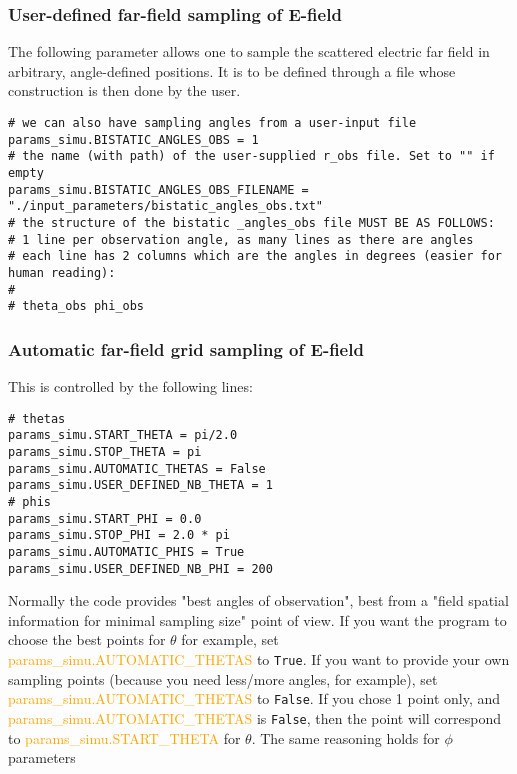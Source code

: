 \documentclass[a4paper,10pt]{book}
\newcommand{\parameter}[1] {\textcolor{orange}{\textsf{#1}}}
\begin{document}
\subsubsection{User-defined far-field sampling of E-field}
%
\par
The following parameter allows one to sample the scattered electric far field in arbitrary, angle-defined positions. It is to be defined through a file whose construction is then done by the user.
\begin{verbatim}
# we can also have sampling angles from a user-input file
params_simu.BISTATIC_ANGLES_OBS = 1
# the name (with path) of the user-supplied r_obs file. Set to "" if empty
params_simu.BISTATIC_ANGLES_OBS_FILENAME = "./input_parameters/bistatic_angles_obs.txt"
# the structure of the bistatic _angles_obs file MUST BE AS FOLLOWS:
# 1 line per observation angle, as many lines as there are angles
# each line has 2 columns which are the angles in degrees (easier for human reading):
#
# theta_obs phi_obs
\end{verbatim}


\subsubsection{Automatic far-field grid sampling of E-field}
%
\par
This is controlled by the following lines:
\begin{verbatim}
# thetas
params_simu.START_THETA = pi/2.0
params_simu.STOP_THETA = pi
params_simu.AUTOMATIC_THETAS = False
params_simu.USER_DEFINED_NB_THETA = 1
# phis
params_simu.START_PHI = 0.0
params_simu.STOP_PHI = 2.0 * pi
params_simu.AUTOMATIC_PHIS = True
params_simu.USER_DEFINED_NB_PHI = 200
\end{verbatim}
%
\par
Normally the code provides "best angles of observation", best from a "field spatial information for minimal sampling size" point of view. If you want the program to choose the best points for $\theta$ for example, set \parameter{params\_simu.AUTOMATIC\_THETAS} to \texttt{True}. If you want to provide your own sampling points (because you need less/more angles, for example), set \parameter{params\_simu.AUTOMATIC\_THETAS} to \texttt{False}. If you chose 1 point only, and \parameter{params\_simu.AUTOMATIC\_THETAS} is \texttt{False}, then the point will correspond to \parameter{params\_simu.START\_THETA} for $\theta$. The same reasoning holds for $\phi$ parameters
\end{document}
